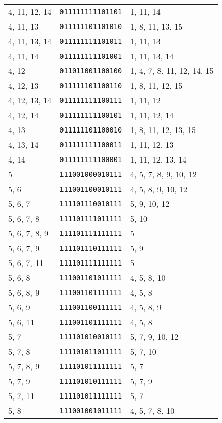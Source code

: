 \documentclass[a4paper,12pt]{article}
\begin{document}
\begin{longtable}{l|l|l}
        4, 11, 12, 14&\texttt{011111111101101}&1, 11, 14\\
        4, 11, 13&\texttt{011111101101010}&1, 8, 11, 13, 15\\
        4, 11, 13, 14&\texttt{011111111101011}&1, 11, 13\\
        4, 11, 14&\texttt{011111111101001}&1, 11, 13, 14\\
        4, 12&\texttt{011011001100100}&1, 4, 7, 8, 11, 12, 14, 15\\
        4, 12, 13&\texttt{011111101100110}&1, 8, 11, 12, 15\\
        4, 12, 13, 14&\texttt{011111111100111}&1, 11, 12\\
        4, 12, 14&\texttt{011111111100101}&1, 11, 12, 14\\
        4, 13&\texttt{011111101100010}&1, 8, 11, 12, 13, 15\\
        4, 13, 14&\texttt{011111111100011}&1, 11, 12, 13\\
        4, 14&\texttt{011111111100001}&1, 11, 12, 13, 14\\
        5&\texttt{111001000010111}&4, 5, 7, 8, 9, 10, 12\\
        5, 6&\texttt{111001100010111}&4, 5, 8, 9, 10, 12\\
        5, 6, 7&\texttt{111101110010111}&5, 9, 10, 12\\
        5, 6, 7, 8&\texttt{111101111011111}&5, 10\\
        5, 6, 7, 8, 9&\texttt{111101111111111}&5\\
        5, 6, 7, 9&\texttt{111101110111111}&5, 9\\
        5, 6, 7, 11&\texttt{111101111111111}&5\\
        5, 6, 8&\texttt{111001101011111}&4, 5, 8, 10\\
        5, 6, 8, 9&\texttt{111001101111111}&4, 5, 8\\
        5, 6, 9&\texttt{111001100111111}&4, 5, 8, 9\\
        5, 6, 11&\texttt{111001101111111}&4, 5, 8\\
        5, 7&\texttt{111101010010111}&5, 7, 9, 10, 12\\
        5, 7, 8&\texttt{111101011011111}&5, 7, 10\\
        5, 7, 8, 9&\texttt{111101011111111}&5, 7\\
        5, 7, 9&\texttt{111101010111111}&5, 7, 9\\
        5, 7, 11&\texttt{111101011111111}&5, 7\\
        5, 8&\texttt{111001001011111}&4, 5, 7, 8, 10\\

\end{longtable}
\end{document}
